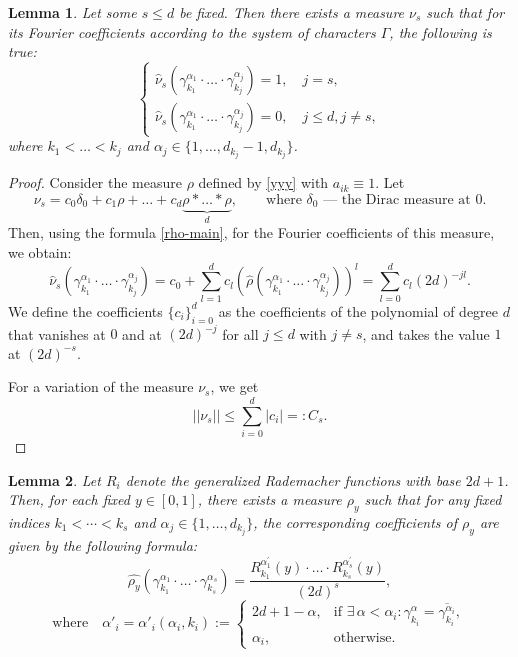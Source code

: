 \documentclass[12pt]{article}
\newtheorem{lemma}{Lemma}
\begin{document}
	
	\begin{lemma} \label{lemma-ppp} Let some $s\le d$ be fixed. Then there exists a measure $\nu_s$ such that for its Fourier coefficients according to the system of characters $\Gamma$, the following is true:
		\[
		\begin{cases}
			\widehat{\nu}_s(\gamma_{k_1}^{\alpha_{1}} \cdot \ldots \cdot \gamma_{k_j}^{\alpha_{j}})  =1, \quad j=s, \\
			\widehat{\nu}_s(\gamma_{k_1}^{\alpha_{1}} \cdot \ldots \cdot \gamma_{k_j}^{\alpha_{j}}) =0, \quad j \le d, j \neq s,
		\end{cases}
		\]
		where $k_1 < \ldots < k_j$ and $\alpha_{j} \in \{1, \ldots, d_{k_j}-1, d_{k_j}\}$.
	\end{lemma}
	\begin{proof}
Consider the measure $\rho$ defined by \eqref{yyy} with $a_{ik} \equiv 1$. Let
		\[
		\nu_s = c_0\delta_0 + c_1\rho + \ldots + c_{d}\underbrace{\rho * \ldots * \rho}_{d}, \qquad \text{where $\delta_0$ --- the Dirac measure at 0}.
		\]
		Then, using the formula \eqref{rho-main}, for the Fourier coefficients of this measure, we obtain:
		\[
		\widehat{\nu}_s(\gamma_{k_1}^{\alpha_{1}} \cdot \ldots \cdot \gamma_{k_j}^{\alpha_{j}}) = c_0 + \sum_{l=1}^{d}c_l (\widehat{\rho}(\gamma_{k_1}^{\alpha_{1}} \cdot \ldots \cdot \gamma_{k_j}^{\alpha_{j}}))^l = \sum_{l=0}^{d}c_l (2d)^{-jl}.
		\]
		We define the coefficients $\{c_i\}_{i=0}^{d}$ as the coefficients of the polynomial of degree $d$ that vanishes at $0$ and at $(2d)^{-j}$ for all $j \le d$ with $j \ne s$, and takes the value $1$ at $(2d)^{-s}$.
		
		For a variation of the measure $\nu_s$, we get
		\begin{equation} \label{2804}
			||\nu_s|| \le \sum_{i=0}^{d} |c_i| =:C_s.		    
		\end{equation}
	\end{proof}
	\begin{lemma} \label{muy}
Let $R_i$ denote the generalized Rademacher functions with base $2d+1$. Then, for each fixed $y \in [0,1]$, there exists a measure $\rho_y$ such that for any fixed indices $k_1 < \cdots < k_s$ and $\alpha_j \in \{1, \ldots, d_{k_j}\}$, the corresponding coefficients of $\rho_y$ are given by the following formula:
		\begin{equation}  \label{muycoef}
			\widehat{\rho_y}( \gamma_{k_1}^{\alpha_1} \cdot \ldots \cdot \gamma_{k_s}^{\alpha_s}) = \frac{ R_{k_1}^{\alpha_1^{\prime}}(y) \cdot \ldots \cdot R_{k_s}^{\alpha_s^{\prime}}(y)}{(2d)^{s}},   \end{equation}
		\begin{equation} \label{alpha'}
			\text{where} \quad \alpha'_i = \alpha'_i(\alpha_i, k_i) := 
			\begin{cases} 
				2d+1-\alpha, & \text{if } \exists\, \alpha < \alpha_i : \gamma_{k_i}^{\alpha} = \overline{\gamma_{k_i}^{\alpha_i}}, \\ 
				\alpha_i, & \text{otherwise}.
			\end{cases} 
		\end{equation}
	\end{lemma}	
\end{document}
